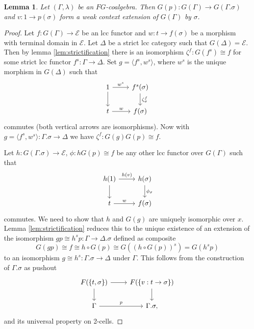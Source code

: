 \documentclass[a4paper]{article}
\newtheorem{lemma}[theorem]{Lemma}
\theoremstyle{remark}
\theoremstyle{definition}
\begin{document}
\begin{lemma}
  \label{lem:strict-ext-is-weak-ext}
  Let $(\Gamma, \lambda)$ be an $FG$-coalgebra.
  Then $G(p) : G(\Gamma) \rightarrow G(\Gamma.\sigma)$ and $v : 1 \rightarrow p(\sigma)$ form a weak context extension of $G(\Gamma)$ by $\sigma$.
\end{lemma}
\begin{proof}
  Let $f : G(\Gamma) \rightarrow \mathcal{E}$ be an lcc functor and $w : t \rightarrow  f(\sigma)$ be a morphism with terminal domain in $\mathcal{E}$.
  Let $\Delta$ be a strict lcc category such that $G(\Delta) = \mathcal{E}$.
  Then by lemma \ref{lem:strictification} there is an isomorphism $\zeta^f : G(f^s) \cong f$ for some strict lcc functor $f^s : \Gamma \rightarrow \Delta$.
  Set $g = \langle f^s, w^s \rangle$, where $w^s$ is the unique morphism in $G(\Delta)$ such that
  \begin{equation}
    \begin{tikzcd}
      1 \arrow[d] \arrow[r, "w^s"] & f^s(\sigma) \arrow[d, "\zeta^f_\sigma"] \\
      t \arrow[r, "w"] & f(\sigma)
    \end{tikzcd}
  \end{equation}
  commutes (both vertical arrows are isomorphisms).
  Now with $g = \langle f^s, w^s \rangle : \Gamma.\sigma \rightarrow \Delta$ we have $\zeta^f : G(g) G(p) \cong f$.

  Let $h : G(\Gamma.\sigma) \rightarrow \mathcal{E}$, $\phi : h G(p) \cong f$ be any other lcc functor over $G(\Gamma)$ such that
  \begin{equation}
    \begin{tikzcd}
      h(1) \arrow[d] \arrow[r, "h(v)"] & h(\sigma) \arrow[d, "\phi_\sigma"] \\
      t \arrow[r, "w"] & f(\sigma)
    \end{tikzcd}
  \end{equation}
  commutes.
  We need to show that $h$ and $G(g)$ are uniquely isomorphic over $x$.
  Lemma \ref{lem:strictification} reduces this to the unique existence of an extension of the isomorphism $g p \cong h^s p : \Gamma \rightarrow \Delta.\sigma$ defined as composite
  \begin{equation}
    G(gp) \cong f \cong h \circ G(p) \cong G((h \circ G(p))^s) = G(h^s p)
  \end{equation}
  to an isomorphism $g \cong h^s : \Gamma.\sigma \rightarrow \Delta$ under $\Gamma$.
  This follows from the construction of $\Gamma.\sigma$ as pushout
  \begin{equation}
    \begin{tikzcd}
      F(\{ t, \sigma \}) \arrow[d] \arrow[r] & F(\{ v : t \rightarrow \sigma \}) \arrow[d] \\
      \Gamma \arrow[r, "p"] & \Gamma.\sigma,
    \end{tikzcd}
  \end{equation}
  and its universal property on 2-cells.
\end{proof}
\end{document}
